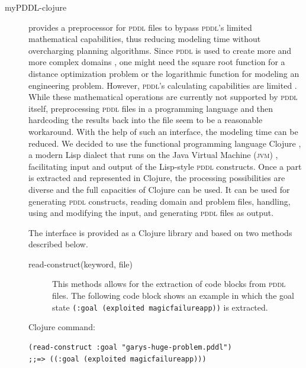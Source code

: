 \documentclass[runningheads]{llncs}
\newcommand{\pddl}{\textsc{pddl}\xspace}
\begin{document}
\begin{description}
\item[myPDDL-clojure] provides a preprocessor for \pddl files to
  bypass \pddl's limited mathematical capabilities, thus reducing
  modeling time without overcharging planning algorithms. Since \pddl
  is used to create more and more complex domains
  \cite{goldman2012type,guerin2012academic}, one might need the square
  root function for a distance optimization problem or the logarithmic
  function for modeling an engineering problem. However, \pddl's
  calculating capabilities are limited
  \cite{parkinson2012increasing}. While these mathematical operations
  are currently not supported by \pddl itself, preprocessing \pddl
  files in a programming language and then hardcoding the results back
  into the file seem to be a reasonable workaround. With the help of
  such an interface, the modeling time can be reduced.  We decided to
  use the functional programming language Clojure
  \cite{hickey2008clojure}, a modern Lisp dialect that runs on the
  Java Virtual Machine (\textsc{jvm}) \cite{lindholm2014java},
  facilitating input and output of the Lisp-style \pddl
  constructs. Once a part is extracted and represented in Clojure, the
  processing possibilities are diverse and the full capacities of
  Clojure can be used. It can be used for generating \pddl constructs,
  reading domain and problem files, handling, using and modifying the
  input, and generating \pddl files as output.

  The interface is provided as a Clojure library and based on two
  methods described below.
\begin{description}
\item[{read-construct(keyword, file)}] This methods allows for the extraction of
  code blocks from \pddl files. The following code block shows an
  example in which the goal state \texttt{(:goal (exploited
    magicfailureapp))} is extracted.
\end{description}
Clojure command:
\begin{verbatim}
(read-construct :goal "garys-huge-problem.pddl")
;;=> ((:goal (exploited magicfailureapp)))
\end{verbatim}


\end{description}
\end{document}
